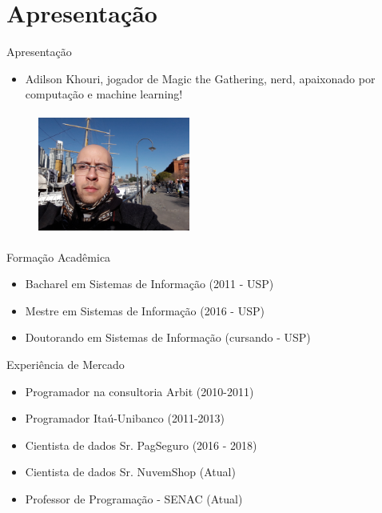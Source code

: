\section{Apresentação}

\begin{frame}	
	\begin{block}{Apresentação}	
		\begin{itemize}
			\item Adilson Khouri,  jogador de Magic the Gathering, nerd, apaixonado por computação e machine learning!
		\end{itemize}
		\begin{figure}[!htb]
			\centering	  				
			\includegraphics[height=4cm, width = 5cm]{./pic/AdilsonArgentina.jpg}
			\label{fig_adilson_argentina}
		\end{figure}
		
	\end{block}
\end{frame}
			
\begin{frame}	
	\begin{block}{Formação Acadêmica}
		 \begin{itemize}
			  \item Bacharel em Sistemas de Informação (2011 - USP)
			  \item Mestre em Sistemas de Informação (2016 - USP)
			  \item Doutorando em Sistemas de Informação (cursando - USP)
		  \end{itemize}
	\end{block}
\end{frame}

\begin{frame}	
	\begin{block}{Experiência de Mercado}
		\begin{itemize}
			\item Programador na consultoria Arbit (2010-2011)
			\item Programador Itaú-Unibanco (2011-2013)
			\item Cientista de dados Sr. PagSeguro (2016 - 2018)
			\item Cientista de dados Sr. NuvemShop (Atual)
			\item Professor de Programação - SENAC (Atual)
		\end{itemize}
	\end{block}
\end{frame}
